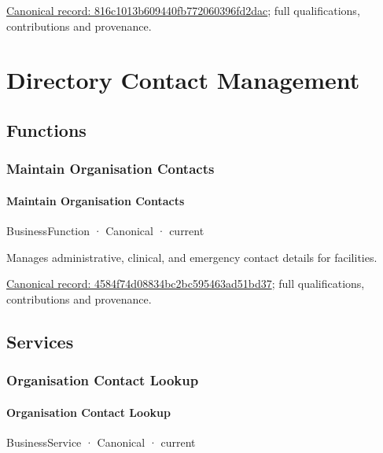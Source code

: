 {\footnotesize \href{../../../../continuum/business/business-service/816c1013b609440fb772060396fd2dac.md}{Canonical record: 816c1013b609440fb772060396fd2dac}; full qualifications, contributions and provenance.}\par
\section{Directory Contact Management}

\subsection{Functions}

\subsubsection{Maintain Organisation Contacts}

\paragraph{Maintain Organisation Contacts}

\label{element:4584f74d08834bc2bc595463ad51bd37}
{\small BusinessFunction · Canonical · current}\par

Manages administrative, clinical, and emergency contact details for facilities.


{\footnotesize \href{../../../../continuum/business/business-function/4584f74d08834bc2bc595463ad51bd37.md}{Canonical record: 4584f74d08834bc2bc595463ad51bd37}; full qualifications, contributions and provenance.}\par
\subsection{Services}

\subsubsection{Organisation Contact Lookup}

\paragraph{Organisation Contact Lookup}

\label{element:551f1e73fb73449a83f3155cb8158f30}
{\small BusinessService · Canonical · current}\par

